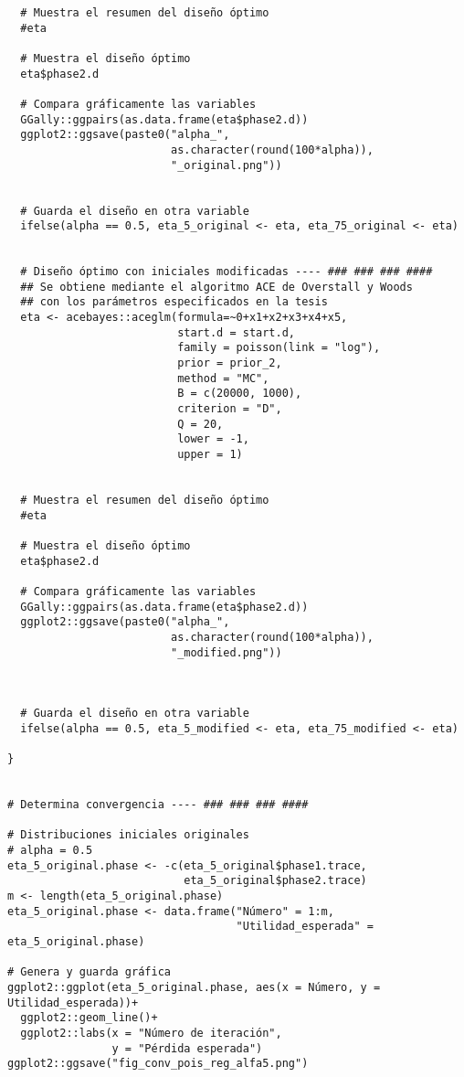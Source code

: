 \begin{lstlisting}
  # Muestra el resumen del diseño óptimo
  #eta
  
  # Muestra el diseño óptimo
  eta$phase2.d
  
  # Compara gráficamente las variables
  GGally::ggpairs(as.data.frame(eta$phase2.d))
  ggplot2::ggsave(paste0("alpha_", 
                         as.character(round(100*alpha)),
                         "_original.png"))
  
  
  # Guarda el diseño en otra variable
  ifelse(alpha == 0.5, eta_5_original <- eta, eta_75_original <- eta)
  
  
  # Diseño óptimo con iniciales modificadas ---- ### ### ### ####
  ## Se obtiene mediante el algoritmo ACE de Overstall y Woods
  ## con los parámetros especificados en la tesis
  eta <- acebayes::aceglm(formula=~0+x1+x2+x3+x4+x5,
                          start.d = start.d, 
                          family = poisson(link = "log"),
                          prior = prior_2,
                          method = "MC",
                          B = c(20000, 1000),
                          criterion = "D",
                          Q = 20,
                          lower = -1,
                          upper = 1)
  
  
  # Muestra el resumen del diseño óptimo
  #eta
  
  # Muestra el diseño óptimo
  eta$phase2.d
  
  # Compara gráficamente las variables
  GGally::ggpairs(as.data.frame(eta$phase2.d))
  ggplot2::ggsave(paste0("alpha_", 
                         as.character(round(100*alpha)),
                         "_modified.png"))
  
  
  
  # Guarda el diseño en otra variable
  ifelse(alpha == 0.5, eta_5_modified <- eta, eta_75_modified <- eta)
  
}


# Determina convergencia ---- ### ### ### ####

# Distribuciones iniciales originales
# alpha = 0.5
eta_5_original.phase <- -c(eta_5_original$phase1.trace, 
                           eta_5_original$phase2.trace)
m <- length(eta_5_original.phase)
eta_5_original.phase <- data.frame("Número" = 1:m, 
                                   "Utilidad_esperada" = eta_5_original.phase)

# Genera y guarda gráfica
ggplot2::ggplot(eta_5_original.phase, aes(x = Número, y = Utilidad_esperada))+
  ggplot2::geom_line()+
  ggplot2::labs(x = "Número de iteración",
                y = "Pérdida esperada")
ggplot2::ggsave("fig_conv_pois_reg_alfa5.png")



\end{lstlisting}
